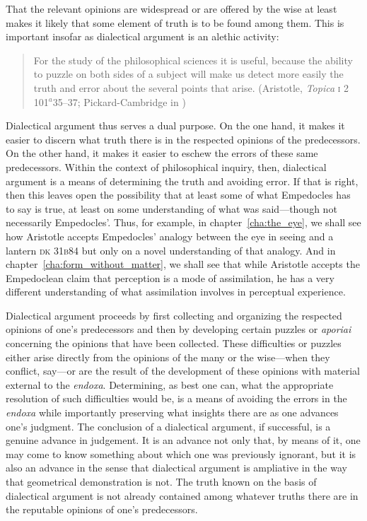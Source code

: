 That the relevant opinions are widespread or are offered by the wise at least makes it likely that some element of truth is to be found among them. This is important insofar as dialectical argument is an alethic activity:
\begin{quote}
	For the study of the philosophical sciences it is useful, because the ability to puzzle on both sides of a subject will make us detect more easily the truth and error about the several points that arise. (Aristotle, \emph{Topica} \textsc{i} 2 101\( ^{a} \)35--37; Pickard-Cambridge in \citealt[3--4]{Barnes:1984uq})
\end{quote}
Dialectical argument thus serves a dual purpose. On the one hand, it makes it easier to discern what truth there is in the respected opinions of the predecessors. On the other hand, it makes it easier to eschew the errors of these same predecessors. Within the context of philosophical inquiry, then, dialectical argument is a means of determining the truth and avoiding error. If that is right, then this leaves open the possibility that at least some of what Empedocles has to say is true, at least on some understanding of what was said---though not necessarily Empedocles'. Thus, for example, in chapter~\ref{cha:the_eye}, we shall see how Aristotle accepts Empedocles' analogy between the eye in seeing and a lantern \textsc{dk} 31\textsc{b}84 but only on a novel understanding of that analogy. And in chapter~\ref{cha:form_without_matter}, we shall see that while Aristotle accepts the Empedoclean claim that perception is a mode of assimilation, he has a very different understanding of what assimilation involves in perceptual experience.

Dialectical argument proceeds by first collecting and organizing the respected opinions of one's predecessors and then by developing certain puzzles or \emph{aporiai} concerning the opinions that have been collected. These difficulties or puzzles either arise directly from the opinions of the many or the wise---when they conflict, say---or are the result of the development of these opinions with material external to the \emph{endoxa}. Determining, as best one can, what the appropriate resolution of such difficulties would be, is a means of avoiding the errors in the \emph{endoxa} while importantly preserving what insights there are as one advances one's judgment. The conclusion of a dialectical argument, if successful, is a genuine advance in judgement. It is an advance not only that, by means of it, one may come to know something about which one was previously ignorant, but it is also an advance in the sense that dialectical argument is ampliative in the way that geometrical demonstration is not. The truth known on the basis of dialectical argument is not already contained among whatever truths there are in the reputable opinions of one's predecessors.

